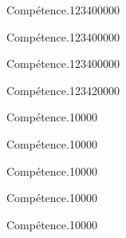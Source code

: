 
\begin{pageAD}  %
\restoregeometry %


\begin{ExoCad}{Compétence.}{1234}{0}{0}{0}{0}{0}

\end{ExoCad}


\begin{ExoCad}{Compétence.}{1234}{0}{0}{0}{0}{0}

\end{ExoCad}


\begin{ExoCad}{Compétence.}{1234}{0}{0}{0}{0}{0}

\end{ExoCad}
 
\end{pageAD} %


\begin{pageParcoursu} %

\begin{ExoCu}{Compétence.}{1234}{2}{0}{0}{0}{0}
  
\end{ExoCu}

\begin{ExoCuN}{Compétence.}{1}{0}{0}{0}{0}

\end{ExoCuN}

\begin{ExoCuN}{Compétence.}{1}{0}{0}{0}{0}

\end{ExoCuN}

\begin{ExoCuN}{Compétence.}{1}{0}{0}{0}{0}

\end{ExoCuN}

\begin{ExoCuN}{Compétence.}{1}{0}{0}{0}{0}

\end{ExoCuN}

\begin{ExoCuN}{Compétence.}{1}{0}{0}{0}{0}

\end{ExoCuN}


\end{pageParcoursu} %
 
